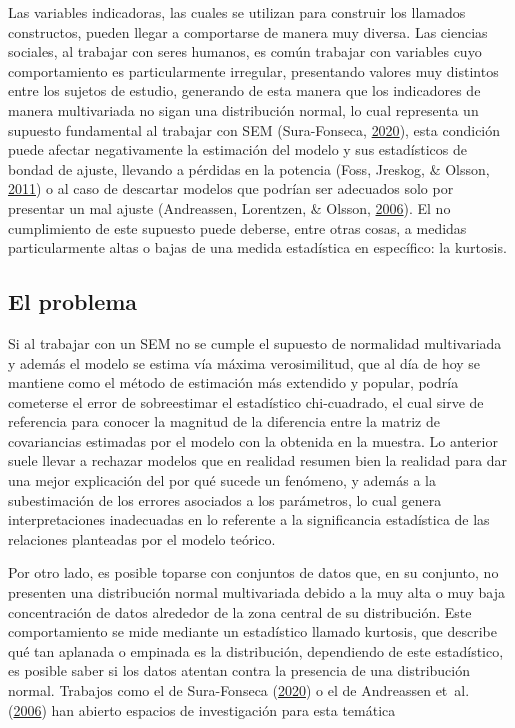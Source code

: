 \documentclass[
  english]{revcoles}
\begin{document}
Las variables indicadoras, las cuales se utilizan para construir los
llamados constructos, pueden llegar a comportarse de manera muy diversa.
Las ciencias sociales, al trabajar con seres humanos, es común trabajar
con variables cuyo comportamiento es particularmente irregular,
presentando valores muy distintos entre los sujetos de estudio,
generando de esta manera que los indicadores de manera multivariada no
sigan una distribución normal, lo cual representa un supuesto
fundamental al trabajar con SEM (Sura-Fonseca,
\protect\hyperlink{ref-SuraFonseca2020}{2020}), esta condición puede
afectar negativamente la estimación del modelo y sus estadísticos de
bondad de ajuste, llevando a pérdidas en la potencia (Foss, Jreskog, \&
Olsson, \protect\hyperlink{ref-Foss2011}{2011}) o al caso de descartar
modelos que podrían ser adecuados solo por presentar un mal ajuste
(Andreassen, Lorentzen, \& Olsson,
\protect\hyperlink{ref-Andreassen2006}{2006}). El no cumplimiento de
este supuesto puede deberse, entre otras cosas, a medidas
particularmente altas o bajas de una medida estadística en específico:
la kurtosis.

\subsection{El problema}

Si al trabajar con un SEM no se cumple el supuesto de normalidad
multivariada y además el modelo se estima vía máxima verosimilitud, que
al día de hoy se mantiene como el método de estimación más extendido y
popular, podría cometerse el error de sobreestimar el estadístico
chi-cuadrado, el cual sirve de referencia para conocer la magnitud de la
diferencia entre la matriz de covariancias estimadas por el modelo con
la obtenida en la muestra. Lo anterior suele llevar a rechazar modelos
que en realidad resumen bien la realidad para dar una mejor explicación
del por qué sucede un fenómeno, y además a la subestimación de los
errores asociados a los parámetros, lo cual genera interpretaciones
inadecuadas en lo referente a la significancia estadística de las
relaciones planteadas por el modelo teórico.

Por otro lado, es posible toparse con conjuntos de datos que, en su
conjunto, no presenten una distribución normal multivariada debido a la
muy alta o muy baja concentración de datos alrededor de la zona central
de su distribución. Este comportamiento se mide mediante un estadístico
llamado kurtosis, que describe qué tan aplanada o empinada es la
distribución, dependiendo de este estadístico, es posible saber si los
datos atentan contra la presencia de una distribución normal. Trabajos
como el de Sura-Fonseca (\protect\hyperlink{ref-SuraFonseca2020}{2020})
o el de Andreassen et~al. (\protect\hyperlink{ref-Andreassen2006}{2006})
han abierto espacios de investigación para esta temática
\end{document}
